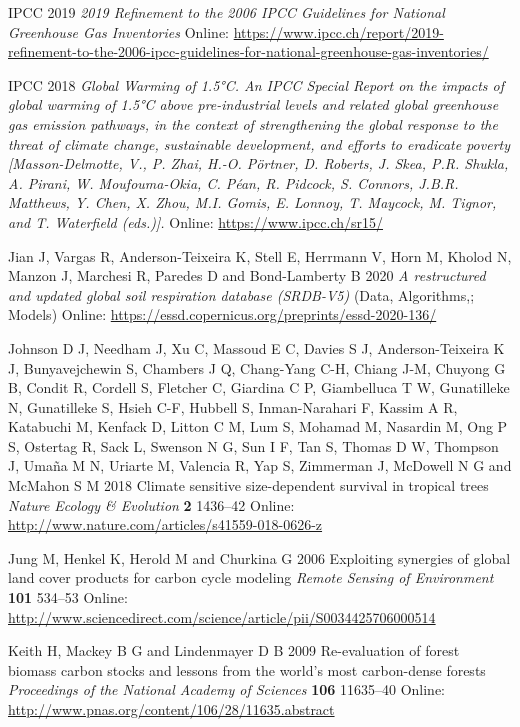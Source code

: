 \documentclass[
]{article}
\newlength{\cslhangindent}
\newenvironment{cslreferences}%
  {\setlength{\parindent}{0pt}%
  \everypar{\setlength{\hangindent}{\cslhangindent}}\ignorespaces}%
  {\par}
\begin{document}
\begin{cslreferences}
\leavevmode\hypertarget{ref-ipcc_2019_2019}{}%
IPCC 2019 \emph{2019 Refinement to the 2006 IPCC Guidelines for National
Greenhouse Gas Inventories} Online:
\url{https://www.ipcc.ch/report/2019-refinement-to-the-2006-ipcc-guidelines-for-national-greenhouse-gas-inventories/}

\leavevmode\hypertarget{ref-ipcc_global_2018}{}%
IPCC 2018 \emph{Global Warming of 1.5°C. An IPCC Special Report on the
impacts of global warming of 1.5°C above pre-industrial levels and
related global greenhouse gas emission pathways, in the context of
strengthening the global response to the threat of climate change,
sustainable development, and efforts to eradicate poverty
{[}Masson-Delmotte, V., P. Zhai, H.-O. Pörtner, D. Roberts, J. Skea,
P.R. Shukla, A. Pirani, W. Moufouma-Okia, C. Péan, R. Pidcock, S.
Connors, J.B.R. Matthews, Y. Chen, X. Zhou, M.I. Gomis, E. Lonnoy, T.
Maycock, M. Tignor, and T. Waterfield (eds.){]}.} Online:
\url{https://www.ipcc.ch/sr15/}

\leavevmode\hypertarget{ref-jian_restructured_2020}{}%
Jian J, Vargas R, Anderson-Teixeira K, Stell E, Herrmann V, Horn M,
Kholod N, Manzon J, Marchesi R, Paredes D and Bond-Lamberty B 2020
\emph{A restructured and updated global soil respiration database
(SRDB-V5)} (Data, Algorithms,; Models) Online:
\url{https://essd.copernicus.org/preprints/essd-2020-136/}

\leavevmode\hypertarget{ref-johnson_climate_2018}{}%
Johnson D J, Needham J, Xu C, Massoud E C, Davies S J, Anderson-Teixeira
K J, Bunyavejchewin S, Chambers J Q, Chang-Yang C-H, Chiang J-M, Chuyong
G B, Condit R, Cordell S, Fletcher C, Giardina C P, Giambelluca T W,
Gunatilleke N, Gunatilleke S, Hsieh C-F, Hubbell S, Inman-Narahari F,
Kassim A R, Katabuchi M, Kenfack D, Litton C M, Lum S, Mohamad M,
Nasardin M, Ong P S, Ostertag R, Sack L, Swenson N G, Sun I F, Tan S,
Thomas D W, Thompson J, Umaña M N, Uriarte M, Valencia R, Yap S,
Zimmerman J, McDowell N G and McMahon S M 2018 Climate sensitive
size-dependent survival in tropical trees \emph{Nature Ecology \&
Evolution} \textbf{2} 1436--42 Online:
\url{http://www.nature.com/articles/s41559-018-0626-z}

\leavevmode\hypertarget{ref-jung_exploiting_2006}{}%
Jung M, Henkel K, Herold M and Churkina G 2006 Exploiting synergies of
global land cover products for carbon cycle modeling \emph{Remote
Sensing of Environment} \textbf{101} 534--53 Online:
\url{http://www.sciencedirect.com/science/article/pii/S0034425706000514}

\leavevmode\hypertarget{ref-keith_re-evaluation_2009}{}%
Keith H, Mackey B G and Lindenmayer D B 2009 Re-evaluation of forest
biomass carbon stocks and lessons from the world's most carbon-dense
forests \emph{Proceedings of the National Academy of Sciences}
\textbf{106} 11635--40 Online:
\url{http://www.pnas.org/content/106/28/11635.abstract}


\end{cslreferences}
\end{document}
